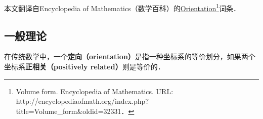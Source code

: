 
本文翻译自Encyclopedia of Mathematics（数学百科）的\href{https://encyclopediaofmath.org/wiki/Volume_form}{Orientation}\footnote{Volume form. Encyclopedia of Mathematics. URL: http://encyclopediaofmath.org/index.php?title=Volume_form&oldid=32331．}词条．

\subsection{一般理论}

在传统数学中，一个\textbf{定向（orientation）}是指一种坐标系的等价划分，如果两个坐标系\textbf{正相关（positively related）}则是等价的．




















